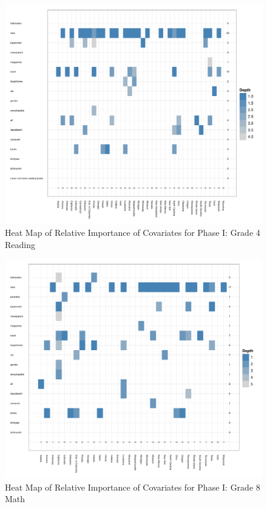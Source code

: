 \documentclass[letterpaper,12p,twoside]{article} %
\begin{document}
\begin{figure}[h]
\begin{center}
\includegraphics[width=\textwidth]{../Figures/g4readingtreeHeat.pdf}
\caption{Heat Map of Relative Importance of Covariates for Phase I: Grade 4 Reading}
\label{fig:g4reading:treeheat}
\end{center}
\end{figure}

\begin{figure}[h]
\begin{center}
\includegraphics[width=\textwidth]{../Figures/g8mathtreeHeat.pdf}
\caption{Heat Map of Relative Importance of Covariates for Phase I: Grade 8 Math}
\label{fig:g8math:treeheat}
\end{center}
\end{figure}
\end{document}
